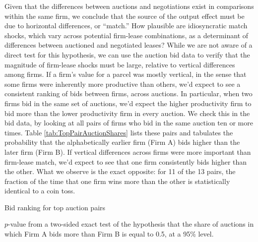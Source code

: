 \documentclass[12pt]{article}
\begin{document}
Given that the differences between auctions and negotiations exist in comparisons within the same firm, we conclude that the source of the output effect must be due to horizontal differences, or ``match.'' How plausible are idiosyncratic match shocks, which vary across potential firm-lease combinations, as a determinant of differences between auctioned and negotiated leases? While we are not aware of a direct test for this hypothesis, we can use the auction bid data to verify that the magnitude of firm-lease shocks must be large, relative to vertical differences among firms. If a firm's value for a parcel was mostly vertical, in the sense that some firms were inherently more productive than others, we'd expect to see a consistent ranking of bids between firms, across auctions.  In particular, when two firms bid in the same set of auctions, we'd expect the higher productivity firm to bid more than the lower productivity firm in every auction.  We check this in the bid data, by looking at all pairs of firms who bid in the same auction ten or more times.  Table \ref{tab:TopPairAuctionShares} lists these pairs and tabulates the probability that the alphabetically earlier firm (Firm A) bids higher than the later firm (Firm B).  If vertical differences across firms were more important than firm-lease match, we'd expect to see that one firm consistently bids higher than the other.  What we observe is the exact opposite: for 11 of the 13 pairs, the fraction of the time that one firm wins more than the other is statistically identical to a coin toss.   

\begin{table}[htbp]
	\begin{center}
	\begin{threeparttable}
		\caption{Bid ranking for top auction pairs}
		\label{tab:TopPairAuctionShares}
		\small
		            
		\begin{tablenotes}
			\footnotesize
			\item $p$-value from a two-sided exact test of the hypothesis that the share of auctions in which Firm A bids more than Firm B is equal to 0.5, at a 95\% level.   
			\end{tablenotes}        
	\end{threeparttable}
	\end{center}
\end{table}
\end{document}
